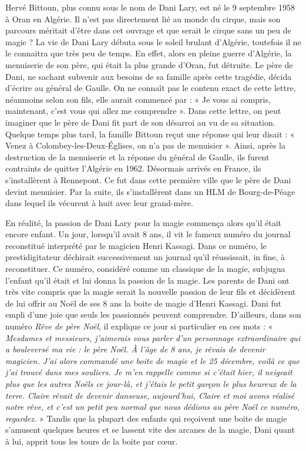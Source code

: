 Hervé Bittoun, plus connu sous le nom de Dani Lary, est né le 9 septembre 1958 à Oran en Algérie. Il n’est pas directement lié au monde du cirque, mais son parcours méritait d’être dans cet ouvrage et que serait le cirque sans un peu de magie ? La vie de Dani Lary débuta sous le soleil brulant d’Algérie, toutefois il ne le connaitra que très peu de temps. En effet, alors en pleine guerre d’Algérie, la menuiserie de son père, qui était la plus grande d’Oran, fut détruite. Le père de Dani, ne sachant subvenir aux besoins de sa famille après cette tragédie, décida d'écrire au général de Gaulle. On ne connaît pas le contenu exact de cette lettre, néanmoins selon son fils, elle aurait commencé par : « Je vous ai compris, maintenant, c'est vous qui allez me comprendre ». Dans cette lettre, on peut imaginer que le père de Dani fit part de son désarroi au vu de sa situation. Quelque temps plus tard, la famille Bittoun reçut une réponse qui leur disait : « Venez à Colombey-les-Deux-Églises, on n'a pas de menuisier ». Ainsi, après la destruction de la menuiserie et la réponse du général de Gaulle, ils furent contraints de quitter l’Algérie en 1962. Désormais arrivés en France, ils s’installèrent à Rennepont. Ce fut dans cette première ville que le père de Dani devint menuisier. Par la suite, ils s’installèrent dans un HLM de Bourg-de-Péage dans lequel ils vécurent à huit avec leur grand-mère.

En réalité, la passion de Dani Lary pour la magie commença alors qu’il était encore enfant. Un jour, lorsqu'il avait 8 ans, il vit le fameux numéro du journal reconstitué interprété par le magicien Henri Kassagi. Dans ce numéro, le prestidigitateur déchirait successivement un journal qu’il réussissait, in fine, à reconstituer. Ce numéro, considéré comme un classique de la magie, subjugua l’enfant qu’il était et lui donna la passion de la magie. Les parents de Dani ont très vite compris que la magie serait la nouvelle passion de leur fils et décidèrent de lui offrir au Noël de ses 8 ans la boite de magie d’Henri Kassagi. Dani fut empli d’une joie que seuls les passionnés peuvent comprendre. D’ailleurs, dans son numéro \textit{Rêve de père Noël}, il explique ce jour si particulier en ces mots : «\textit{ Mesdames et messieurs, j’aimerais vous parler d’un personnage extraordinaire qui a bouleversé ma vie : le père Noël. À l’âge de 8 ans, je rêvais de devenir magicien. J'ai alors commandé une boite de magie et le 25 décembre, voilà ce que j’ai trouvé dans mes souliers. Je m’en rappelle comme si c’était hier, il neigeait plus que les autres Noëls ce jour-là, et j’étais le petit garçon le plus heureux de la terre. Claire rêvait de devenir danseuse, aujourd'hui, Claire et moi avons réalisé notre rêve, et c’est un petit peu normal que nous dédions au père Noël ce numéro, regardez. }» Tandis que la plupart des enfants qui reçoivent une boite de magie s’amusent quelques heures et se lassent vite des arcanes de la magie, Dani quant à lui, apprit tous les tours de la boite par cœur. 

